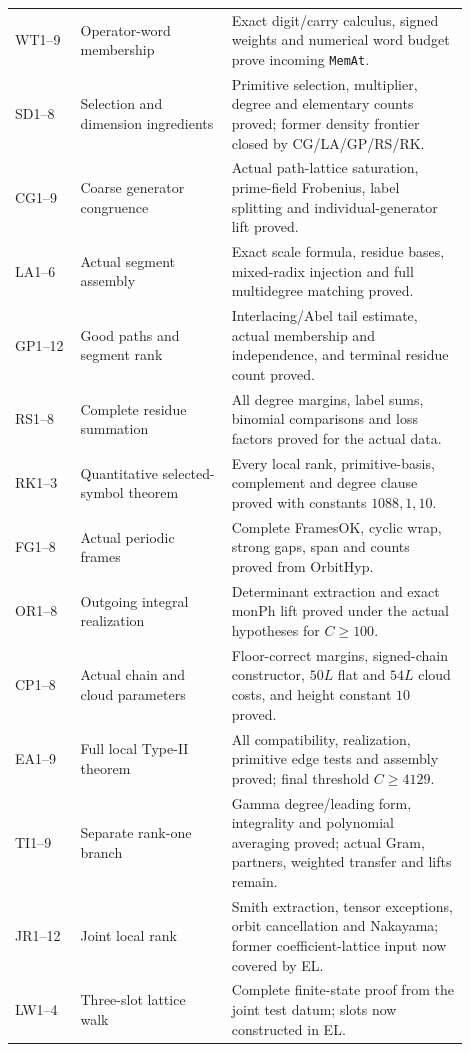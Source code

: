 \documentclass[11pt,a4paper]{article}
\numberwithin{equation}{section}
\theoremstyle{remark}\newtheorem{remark}[theorem]{Remark}
\begin{document}
\begin{longtable}{>{\raggedright\arraybackslash}p{0.13\linewidth}>{\raggedright\arraybackslash}p{0.30\linewidth}>{\raggedright\arraybackslash}p{0.47\linewidth}}
WT1--9 & Operator-word membership & Exact digit/carry calculus, signed weights and numerical word budget prove incoming \texttt{MemAt}.\\[3pt]
SD1--8 & Selection and dimension ingredients & Primitive selection, multiplier, degree and elementary counts proved; former density frontier closed by CG/LA/GP/RS/RK.\\[3pt]
CG1--9 & Coarse generator congruence & Actual path-lattice saturation, prime-field Frobenius, label splitting and individual-generator lift proved.\\[3pt]
LA1--6 & Actual segment assembly & Exact scale formula, residue bases, mixed-radix injection and full multidegree matching proved.\\[3pt]
GP1--12 & Good paths and segment rank & Interlacing/Abel tail estimate, actual membership and independence, and terminal residue count proved.\\[3pt]
RS1--8 & Complete residue summation & All degree margins, label sums, binomial comparisons and loss factors proved for the actual data.\\[3pt]
RK1--3 & Quantitative selected-symbol theorem & Every local rank, primitive-basis, complement and degree clause proved with constants $1088,1,10$.\\[3pt]
FG1--8 & Actual periodic frames & Complete FramesOK, cyclic wrap, strong gaps, span and counts proved from OrbitHyp.\\[3pt]
OR1--8 & Outgoing integral realization & Determinant extraction and exact monPh lift proved under the actual hypotheses for $C\ge100$.\\[3pt]
CP1--8 & Actual chain and cloud parameters & Floor-correct margins, signed-chain constructor, $50L$ flat and $54L$ cloud costs, and height constant $10$ proved.\\[3pt]
EA1--9 & Full local Type-II theorem & All compatibility, realization, primitive edge tests and assembly proved; final threshold $C\ge4129$.\\[3pt]
TI1--9 & Separate rank-one branch & Gamma degree/leading form, integrality and polynomial averaging proved; actual Gram, partners, weighted transfer and lifts remain.\\[3pt]
JR1--12 & Joint local rank & Smith extraction, tensor exceptions, orbit cancellation and Nakayama; former coefficient-lattice input now covered by EL.\\[3pt]
LW1--4 & Three-slot lattice walk & Complete finite-state proof from the joint test datum; slots now constructed in EL.\\[3pt]

\end{longtable}
\end{document}
